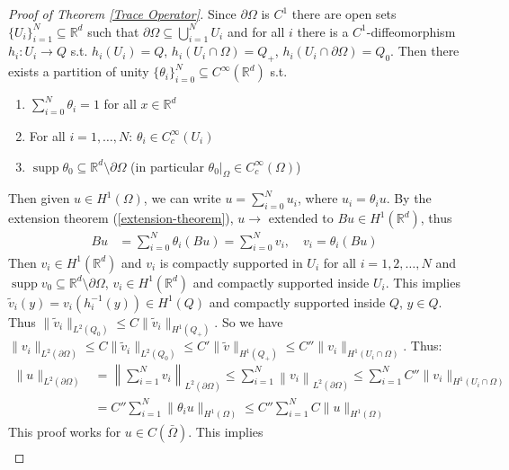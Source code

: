 \documentclass{report}
\theoremstyle{tommy}
\newcommand{\supp}{\operatorname{supp}}
\begin{document}
  \begin{proof}[Proof of Theorem \ref{Trace Operator}] Since \(\partial \Omega\) is \(C^1\) there are open sets \(\{U_i\}_{i=1}^N \subseteq \mathbb{R}^d\) such that \(\partial \Omega \subseteq \bigcup_{i=1}^N U_i\) and for all \(i\) there is a \(C^1\)-diffeomorphism \(h_i: U_i \to Q\) s.t. \(h_i(U_i) = Q\), \(h_i(U_i \cap \Omega) = Q_+\), \(h_i(U_i \cap \partial \Omega) = Q_0\). Then there exists a partition of unity \(\{\theta_i\}_{i=0}^N \subseteq C^\infty(\mathbb{R}^d)\) s.t.
    \begin{enumerate}
      \item \(\sum_{i=0}^N \theta_i = 1\) for all \(x \in \mathbb{R}^d\)
      \item For all \(i=1, \dots, N\): \(\theta_i \in C_c^\infty(U_i)\)
      \item \(\supp \theta_0 \subseteq \mathbb{R}^d \setminus \partial \Omega\) (in particular \(\theta_0|_\Omega \in C_c^\infty(\Omega)\))
    \end{enumerate}
    Then given \(u \in H^1(\Omega)\), we can write \(u = \sum_{i=0}^N u_i\), where \(u_i = \theta_i u\). By the extension theorem (\ref{extension-theorem}), \(u \longrightarrow \) extended to \(Bu \in H^1(\mathbb{R}^d)\), thus
    \begin{align*}
      Bu &= \sum_{i=0}^N \theta_i (Bu) = \sum_{i=0}^N v_i, \quad v_i = \theta_i(Bu)
    \end{align*}
    Then \(v_i \in H^1(\mathbb{R}^d)\) and \(v_i\) is compactly supported in \(U_i\) for all \(i=1, 2, \dots, N\) and \(\supp v_0 \subseteq \mathbb{R}^d \setminus \partial \Omega\), \(v_i \in H^1(\mathbb{R}^d)\) and compactly supported inside \(U_i\). This implies \(\tilde v_i(y) = v_i(h^{-1}_i(y)) \in H^1(Q)\) and compactly supported inside \(Q\), \(y \in Q\). Thus \(\|\tilde v_i\|_{L^2(Q_0)} \le C \|\tilde v_i\|_{H^1(Q_+)}\). So we have \(\|v_i\|_{L^2(\partial \Omega)} \le C \|\tilde v_i\|_{L^2(Q_0)} \le C' \|\tilde v\|_{H^1(Q_+)} \le C'' \|v_i\|_{H^1(U_i \cap \Omega)}\). Thus:
    \begin{align*}
      \|u\|_{L^2(\partial \Omega)} &= \left\| \sum_{i=1}^N v_i\right\|_{L^2(\partial \Omega)} \le \sum_{i=1}^N \left\|v_i\right\|_{L^2(\partial \Omega)} \le \sum_{i=1}^N C'' \|v_i\|_{H^1(U_i \cap \Omega)} \\
      &= C'' \sum_{i=1}^N \|\theta_i u\|_{H^1(\Omega)} \le C'' \sum_{i=1}^N C \|u\|_{H^1(\Omega)}
    \end{align*}
    This proof works for \(u \in C(\bar \Omega)\). This implies
    \begin{align*}

\end{align*}
\end{proof}
\end{document}
